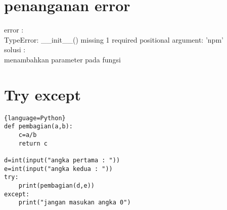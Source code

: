 \documentclass[a4paper,12pt]{report}
\begin{document}
\section*{penanganan error}
error :\\
TypeError: \_\_init\_\_() missing 1 required positional argument: 'npm'\\
solusi :\\
menambahkan parameter pada fungsi
\section*{Try except}
\begin{lstlisting}{language=Python}
def pembagian(a,b):
    c=a/b
    return c

d=int(input("angka pertama : "))
e=int(input("angka kedua : "))
try:
    print(pembagian(d,e))
except:
    print("jangan masukan angka 0")
\end{lstlisting}
\end{document}
